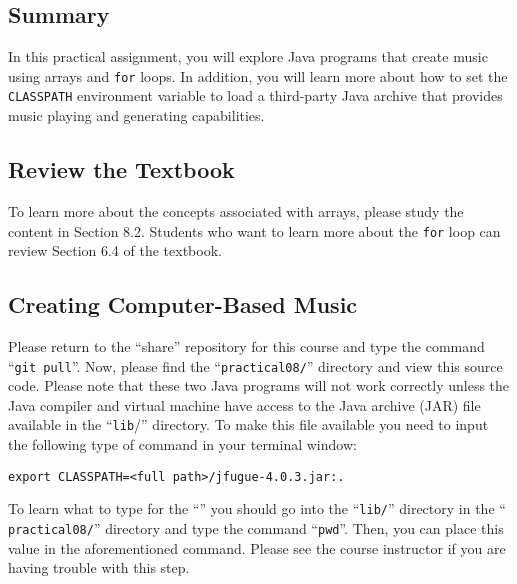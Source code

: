 



\subsection*{Summary}
\vspace*{-.05in}

In this practical assignment, you will explore Java programs that create music using arrays and {\tt for} loops. In
addition, you will learn more about how to set the {\tt CLASSPATH} environment variable to load a third-party Java
archive that provides music playing and generating capabilities.

\vspace*{-.1in}
\subsection*{Review the Textbook}
\vspace*{-.05in}

To learn more about the concepts associated with arrays, please study the content in Section 8.2. Students who want to
learn more about the {\tt for} loop can review Section 6.4 of the textbook.

\vspace*{-.1in}
\subsection*{Creating Computer-Based Music}
\vspace*{-.05in}

Please return to the ``share'' repository for this course and type the command ``{\tt git pull}''. Now, please find the
``{\tt practical08/}'' directory and view this source code. Please note that these two Java programs will not work
correctly unless the Java compiler and virtual machine have access to the Java archive (JAR) file available in the
``{\tt lib}/'' directory. To make this file available you need to input the following type of command in your terminal
window:

  {\tt export CLASSPATH=<full path>/jfugue-4.0.3.jar:.}

  To learn what to type for the ``{\tt <full path>}'' you should go into the ``{\tt lib/}'' directory in the ``{\tt
practical08/}'' directory and type the command ``{\tt pwd}''.  Then, you can place this value in the aforementioned
command. Please see the course instructor if you are having trouble with this step.

